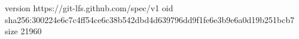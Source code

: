 version https://git-lfs.github.com/spec/v1
oid sha256:300224e6c7c4ff54ce6c38b542dbd4d639796dd9f1fe6e3b9e6a0d19b251bcb7
size 21960
